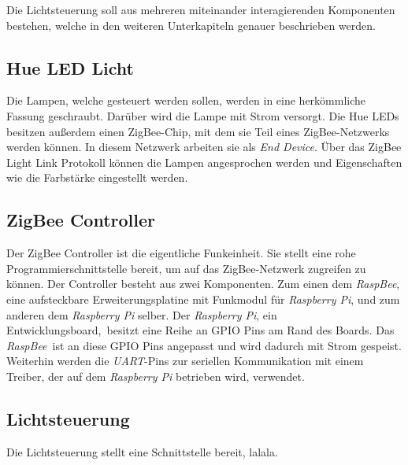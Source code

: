 \documentclass[a4paper,12pt]{article}
\begin{document}
Die Lichtsteuerung soll aus mehreren miteinander interagierenden Komponenten bestehen, welche in den weiteren Unterkapiteln genauer beschrieben werden.

\subsection{Hue LED Licht}

Die Lampen, welche gesteuert werden sollen, werden in eine herkömmliche Fassung geschraubt. Darüber wird die Lampe mit Strom versorgt. Die Hue LEDs besitzen außerdem einen ZigBee-Chip, mit dem sie Teil eines ZigBee-Netzwerks werden können. In diesem Netzwerk arbeiten sie als \emph{End Device}. Über das ZigBee Light Link Protokoll können die Lampen angesprochen werden und Eigenschaften wie die Farbstärke eingestellt werden.

\subsection{ZigBee Controller}

Der ZigBee Controller ist die eigentliche Funkeinheit. Sie stellt eine rohe Programmierschnittstelle bereit, um auf das ZigBee-Netzwerk zugreifen zu können. Der Controller besteht aus zwei Komponenten. Zum einen dem \emph{RaspBee}, eine aufsteckbare Erweiterungsplatine mit Funkmodul für \emph{Raspberry Pi}, und zum anderen dem \emph{Raspberry Pi} selber. Der \emph{Raspberry Pi}, ein Entwicklungsboard, besitzt eine Reihe an GPIO Pins am Rand des Boards. Das \emph{RaspBee} ist an diese GPIO Pins angepasst und wird dadurch mit Strom gespeist. Weiterhin werden die \emph{UART}-Pins zur seriellen Kommunikation mit einem Treiber, der auf dem \emph{Raspberry Pi} betrieben wird, verwendet.

\subsection{Lichtsteuerung}

Die Lichtsteuerung stellt eine Schnittstelle bereit, lalala.
\end{document}
